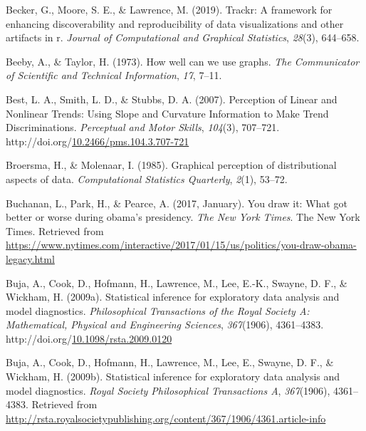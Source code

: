 \documentclass[print]{nuthesis}
\newlength{\cslhangindent}
\newenvironment{CSLReferences}[2]%
{\setlength{\parindent}{0pt}%
\everypar{\setlength{\hangindent}{\cslhangindent}}\ignorespaces}%
{\par}
\begin{document}
\begin{CSLReferences}{1}{0}
\leavevmode{}%
Becker, G., Moore, S. E., \& Lawrence, M. (2019). Trackr: A framework for enhancing discoverability and reproducibility of data visualizations and other artifacts in r. \emph{Journal of Computational and Graphical Statistics}, \emph{28}(3), 644--658.

\leavevmode{}%
Beeby, A., \& Taylor, H. (1973). How well can we use graphs. \emph{The Communicator of Scientific and Technical Information}, \emph{17}, 7--11.

\leavevmode{}%
Best, L. A., Smith, L. D., \& Stubbs, D. A. (2007). Perception of {Linear} and {Nonlinear} {Trends}: {Using} {Slope} and {Curvature} {Information} to {Make} {Trend} {Discriminations}. \emph{Perceptual and Motor Skills}, \emph{104}(3), 707--721. http://doi.org/\href{https://doi.org/10.2466/pms.104.3.707-721}{10.2466/pms.104.3.707-721}

\leavevmode{}%
Broersma, H., \& Molenaar, I. (1985). Graphical perception of distributional aspects of data. \emph{Computational Statistics Quarterly}, \emph{2}(1), 53--72.

\leavevmode{}%
Buchanan, L., Park, H., \& Pearce, A. (2017, January). You draw it: What got better or worse during obama's presidency. \emph{The New York Times}. The New York Times. Retrieved from \url{https://www.nytimes.com/interactive/2017/01/15/us/politics/you-draw-obama-legacy.html}

\leavevmode{}%
Buja, A., Cook, D., Hofmann, H., Lawrence, M., Lee, E.-K., Swayne, D. F., \& Wickham, H. (2009a). Statistical inference for exploratory data analysis and model diagnostics. \emph{Philosophical Transactions of the Royal Society A: Mathematical, Physical and Engineering Sciences}, \emph{367}(1906), 4361--4383. http://doi.org/\href{https://doi.org/10.1098/rsta.2009.0120}{10.1098/rsta.2009.0120}

\leavevmode{}%
Buja, A., Cook, D., Hofmann, H., Lawrence, M., Lee, E., Swayne, D. F., \& Wickham, H. (2009b). Statistical inference for exploratory data analysis and model diagnostics. \emph{Royal Society Philosophical Transactions A}, \emph{367}(1906), 4361--4383. Retrieved from \url{http://rsta.royalsocietypublishing.org/content/367/1906/4361.article-info}


\end{CSLReferences}
\end{document}
